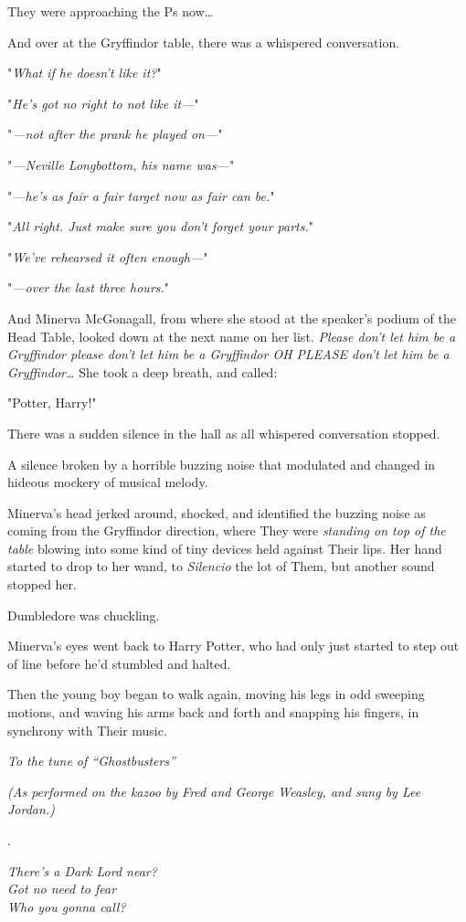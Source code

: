 They were approaching the Ps now{\ldots}

And over at the Gryffindor table, there was a whispered conversation.

"\emph{What if he doesn't like it?}"

"\emph{He's got no right to not like it---}"

"\emph{---not after the prank he played on---}"

"\emph{---Neville Longbottom, his name was---}"

"\emph{---he's as fair a fair target now as fair can be.}"

"\emph{All right. Just make sure you don't forget your parts.}"

"\emph{We've rehearsed it often enough---}"

"\emph{---over the last three hours.}"

And Minerva McGonagall, from where she stood at the speaker's podium of the 
Head Table, looked down at the next name on her list. \emph{Please don't let 
him be a Gryffindor please don't let him be a Gryffindor OH PLEASE don't let 
him be a Gryffindor{\ldots}} She took a deep breath, and called:

"Potter, Harry!"

There was a sudden silence in the hall as all whispered conversation stopped.

A silence broken by a horrible buzzing noise that modulated and changed in 
hideous mockery of musical melody.

Minerva's head jerked around, shocked, and identified the buzzing noise as 
coming from the Gryffindor direction, where They were \emph{standing on top of 
the table} blowing into some kind of tiny devices held against Their lips. Her 
hand started to drop to her wand, to \emph{Silencio} the lot of Them, but 
another sound stopped her.

Dumbledore was chuckling.

Minerva's eyes went back to Harry Potter, who had only just started to step out 
of line before he'd stumbled and halted.

Then the young boy began to walk again, moving his legs in odd sweeping 
motions, and waving his arms back and forth and snapping his fingers, in 
synchrony with Their music.

\begin{center}
\emph{To the tune of ``Ghostbusters''}

\emph{(As performed on the kazoo by Fred and George Weasley,
and sung by Lee Jordan.)}

.

\emph{There's a Dark Lord near?\\
Got no need to fear\\
Who you gonna call?}
\end{center}


